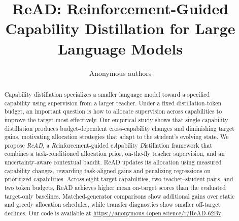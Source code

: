 \documentclass{article} %
\title{ReAD: Reinforcement-Guided Capability Distillation for Large Language Models}
\author{Anonymous authors}
\theoremstyle{plain}
\theoremstyle{definition}
\theoremstyle{remark}
\theoremstyle{problem}
\begin{document}
\maketitle

\begin{abstract}
Capability distillation specializes a smaller language model toward a specified capability using supervision from a larger teacher. Under a fixed distillation-token budget, an important question is how to allocate supervision across capabilities to improve the target most effectively. Our empirical study shows that single-capability distillation produces budget-dependent cross-capability changes and diminishing target gains, motivating allocation strategies that adapt to the student's evolving state. We propose \textit{ReAD}, a \textit{Re}inforcement-guided c\textit{A}pability \textit{D}istillation framework that combines a task-conditioned allocation prior, on-the-fly teacher supervision, and an uncertainty-aware contextual bandit. ReAD updates its allocation using measured capability changes, rewarding task-aligned gains and penalizing regressions on prioritized capabilities. Across eight target capabilities, two teacher--student pairs, and two token budgets, ReAD achieves higher mean on-target scores than the evaluated target-only baselines. Matched-generator comparisons show additional gains over static and greedy allocation schedules, while transfer diagnostics show smaller off-target declines. Our code is available at
\url{https://anonymous.4open.science/r/ReAD-62B7}. %
\end{abstract}













\appendix
\setcounter{topnumber}{3}\setcounter{totalnumber}{5}\renewcommand{\topfraction}{0.9}\renewcommand{\textfraction}{0.08}

\newpage

\end{document}
